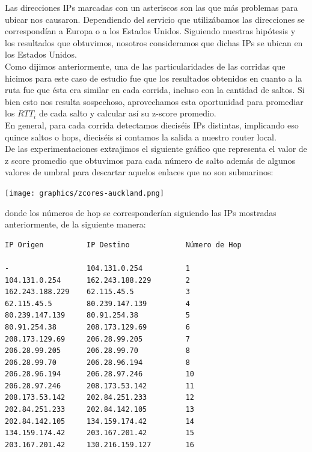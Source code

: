 \indent Las direcciones IPs marcadas con un asteriscos son las que más problemas para ubicar nos causaron. Dependiendo del servicio que utilizábamos las direcciones se correspondían a Europa o a los Estados Unidos. Siguiendo nuestras hipótesis y los resultados que obtuvimos, nosotros consideramos que dichas IPs se ubican en los Estados Unidos.\\


\indent Como dijimos anteriormente, una de las particularidades de las corridas que hicimos para este caso de estudio fue que los resultados obtenidos en cuanto a la ruta fue que ésta era similar en cada corrida, incluso con la cantidad de saltos. Si bien esto nos resulta sospechoso, aprovechamos esta oportunidad para promediar los $RTT_i$ de cada salto y calcular así su z-score promedio.\\
\indent En general, para cada corrida detectamos dieciséis IPs distintas, implicando eso quince saltos o hops, dieciséis si contamos la salida a nuestro router local.\\
\indent De las experimentaciones extrajimos el siguiente gráfico que representa el valor de z score promedio que obtuvimos para cada número de salto además de algunos valores de umbral para descartar aquelos enlaces que no son submarinos:\\

\begin{center}
	\texttt{[image: graphics/zcores-auckland.png]}
\end{center}


donde los números de hop se corresponderían siguiendo las IPs mostradas anteriormente, de la siguiente manera:\\

\begin{verbatim}
IP Origen          IP Destino             Número de Hop

-                  104.131.0.254          1
104.131.0.254      162.243.188.229        2
162.243.188.229    62.115.45.5            3
62.115.45.5        80.239.147.139         4
80.239.147.139     80.91.254.38           5
80.91.254.38       208.173.129.69         6 
208.173.129.69     206.28.99.205          7
206.28.99.205      206.28.99.70           8
206.28.99.70       206.28.96.194          8
206.28.96.194      206.28.97.246          10
206.28.97.246      208.173.53.142         11 
208.173.53.142     202.84.251.233         12
202.84.251.233     202.84.142.105         13
202.84.142.105     134.159.174.42         14
134.159.174.42     203.167.201.42         15
203.167.201.42     130.216.159.127        16
\end{verbatim}

